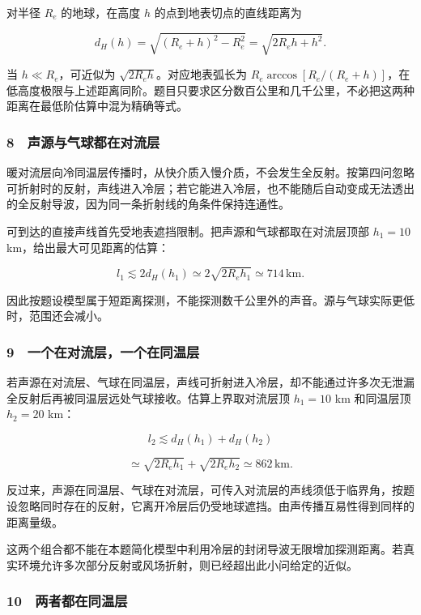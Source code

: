 \documentclass[12pt,a4paper,fontset=fandol]{ctexart}
\begin{document}
对半径 \(R_e\) 的地球，在高度 \(h\) 的点到地表切点的直线距离为

\[d_H(h)=\sqrt{(R_e+h)^2-R_e^2}
=\sqrt{2R_eh+h^2}.\]

当 \(h\ll R_e\)，可近似为 \(\sqrt{2R_eh}\)。对应地表弧长为
\(R_e\arccos[R_e/(R_e+h)]\)，在低高度极限与上述距离同阶。题目只要求区分数百公里和几千公里，不必把这两种距离在最低阶估算中混为精确等式。

\subsubsection{8　声源与气球都在对流层}\label{ux58f0ux6e90ux4e0eux6c14ux7403ux90fdux5728ux5bf9ux6d41ux5c42}

暖对流层向冷同温层传播时，从快介质入慢介质，不会发生全反射。按第四问忽略可折射时的反射，声线进入冷层；若它能进入冷层，也不能随后自动变成无法透出的全反射导波，因为同一条折射线的角条件保持连通性。

可到达的直接声线首先受地表遮挡限制。把声源和气球都取在对流层顶部
\(h_1=10\) km，给出最大可见距离的估算：

\[l_1\lesssim2d_H(h_1)
\simeq2\sqrt{2R_eh_1}\simeq714\,\mathrm{km}.\]

因此按题设模型属于短距离探测，不能探测数千公里外的声音。源与气球实际更低时，范围还会减小。

\subsubsection{9　一个在对流层，一个在同温层}\label{ux4e00ux4e2aux5728ux5bf9ux6d41ux5c42ux4e00ux4e2aux5728ux540cux6e29ux5c42}

若声源在对流层、气球在同温层，声线可折射进入冷层，却不能通过许多次无泄漏全反射后再被同温层远处气球接收。估算上界取对流层顶
\(h_1=10\) km 和同温层顶 \(h_2=20\) km：

\[l_2\lesssim d_H(h_1)+d_H(h_2)\]

\[\simeq\sqrt{2R_eh_1}+\sqrt{2R_eh_2}
\simeq862\,\mathrm{km}.\]

反过来，声源在同温层、气球在对流层，可传入对流层的声线须低于临界角，按题设忽略同时存在的反射，它离开冷层后仍受地球遮挡。由声传播互易性得到同样的距离量级。

这两个组合都不能在本题简化模型中利用冷层的封闭导波无限增加探测距离。若真实环境允许多次部分反射或风场折射，则已经超出此小问给定的近似。

\subsubsection{10　两者都在同温层}\label{ux4e24ux8005ux90fdux5728ux540cux6e29ux5c42}
\end{document}
